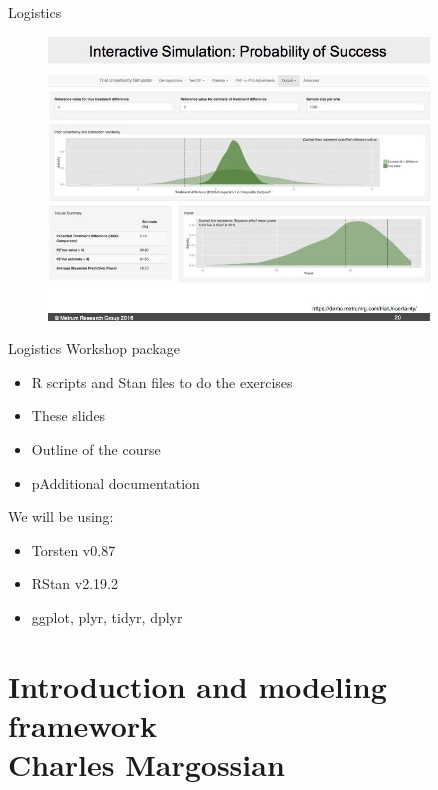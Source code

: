 \documentclass[presentation]{beamer}
\begin{document}
\begin{frame}[label={sec:org6f5ae62}]{Logistics}
\begin{latex}
\begin{figure}
\begin{minipage}{0.3\textwidth}
  \end{minipage}
  \begin{minipage}{0.3\textwidth}
    \centering
    \includegraphics[width=0.9\textwidth]{metworx_decisionmakingtools}
  \end{minipage}
\end{figure}
\end{latex}
\end{frame}

\begin{frame}[label={sec:org059a5be}]{Logistics}
Workshop package
\begin{itemize}
\item R scripts and Stan files to do the exercises
\item These slides
\item Outline of the course
\item pAdditional documentation
\end{itemize}

We will be using:
\begin{itemize}
\item Torsten v0.87
\item RStan v2.19.2
\item ggplot, plyr, tidyr, dplyr
\end{itemize}
\end{frame}

\section{Introduction and modeling framework \\ \small{Charles Margossian}}
\label{sec:org66a4d60}
\end{document}
